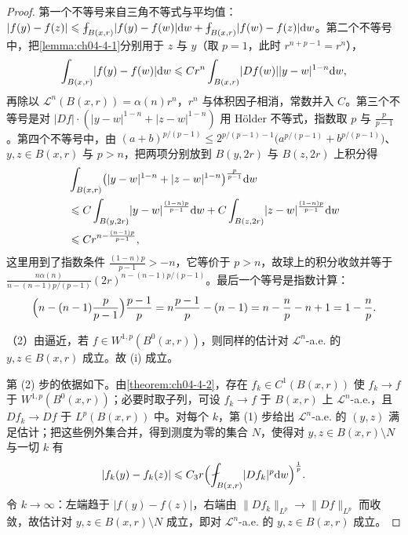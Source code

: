 \documentclass[../../main.tex]{subfiles}%
\begin{document}
\begin{proof}
第一个不等号来自三角不等式与平均值：$\lvert f(y)-f(z)\rvert\leqslant\fint_{B(x,r)}\lvert f(y)-f(w)\rvert\diff w+\fint_{B(x,r)}\lvert f(w)-f(z)\rvert\diff w$。第二个不等号中，把\cref{lemma:ch04-4-1}分别用于 $z$ 与 $y$（取 $p=1$，此时 $r^{n+p-1}=r^{n}$），%
\begin{align*}
\int_{B(x,r)}\lvert f(y)-f(w)\rvert\mathrm{d} w\leqslant C r^{n}\int_{B(x,r)}\lvert Df(w)\rvert\lvert y-w\rvert^{1-n}\mathrm{d} w,
\end{align*}
再除以 $\mathcal{L}^{n}(B(x,r))=\alpha(n)r^{n}$，$r^{n}$ 与体积因子相消，常数并入 $C$。第三个不等号是对 $\lvert Df\rvert\cdot(\lvert y-w\rvert^{1-n}+\lvert z-w\rvert^{1-n})$ 用 Hölder 不等式，指数取 $p$ 与 $\frac{p}{p-1}$。第四个不等号中，由 $(a+b)^{p/(p-1)}\leqslant2^{p/(p-1)-1}\bigl(a^{p/(p-1)}+b^{p/(p-1)}\bigr)$、$y,z\in B(x,r)$ 与 $p>n$，把两项分别放到 $B(y,2r)$ 与 $B(z,2r)$ 上积分得
\begin{align*}
&\int_{B(x,r)}\bigl(\lvert y-w\rvert^{1-n}+\lvert z-w\rvert^{1-n}\bigr)^{\frac{p}{p-1}}\mathrm{d} w\\
&\leqslant C\int_{B(y,2r)}\lvert y-w\rvert^{\frac{(1-n)p}{p-1}}\mathrm{d} w+C\int_{B(z,2r)}\lvert z-w\rvert^{\frac{(1-n)p}{p-1}}\mathrm{d} w\\
&\leqslant C r^{n-\frac{(n-1)p}{p-1}},
\end{align*}
这里用到了指数条件 $\frac{(1-n)p}{p-1}>-n$，它等价于 $p>n$，故球上的积分收敛并等于 $\frac{n\alpha(n)}{n-(n-1)p/(p-1)}(2r)^{n-(n-1)p/(p-1)}$。最后一个等号是指数计算：
\begin{align*}
\Bigl(n-(n-1)\frac{p}{p-1}\Bigr)\frac{p-1}{p}=n\frac{p-1}{p}-(n-1)=n-\frac{n}{p}-n+1=1-\frac{n}{p}.
\end{align*}

（2）由逼近，若 $f\in W^{1,p}(B^{0}(x,r))$，则同样的估计对 $\mathcal{L}^{n}$-a.e. 的 $y,z\in B(x,r)$ 成立。故 (i) 成立。

第 (2) 步的依据如下。由\cref{theorem:ch04-4-2}，存在 $f_k\in C^1(B(x,r))$ 使 $f_k\to f$ 于 $W^{1,p}(B^{0}(x,r))$；必要时取子列，可设 $f_k\to f$ 于 $B(x,r)$ 上 $\mathcal{L}^{n}$-a.e.，且 $Df_k\to Df$ 于 $L^{p}(B(x,r))$ 中。对每个 $k$，第 (1) 步给出 $\mathcal{L}^{n}$-a.e. 的 $(y,z)$ 满足估计；把这些例外集合并，得到测度为零的集合 $N$，使得对 $y,z\in B(x,r)\setminus N$ 与一切 $k$ 有%
\begin{align*}
\lvert f_k(y)-f_k(z)\rvert\leqslant C_3r\Bigl(\fint_{B(x,r)}\lvert Df_k\rvert^{p}\diff w\Bigr)^{\frac{1}{p}} .
\end{align*}
令 $k\to\infty$：左端趋于 $\lvert f(y)-f(z)\rvert$，右端由 $\lVert Df_k\rVert_{L^{p}}\to\lVert Df\rVert_{L^{p}}$ 而收敛，故估计对 $y,z\in B(x,r)\setminus N$ 成立，即对 $\mathcal{L}^{n}$-a.e. 的 $y,z\in B(x,r)$ 成立。


\end{proof}
\end{document}
